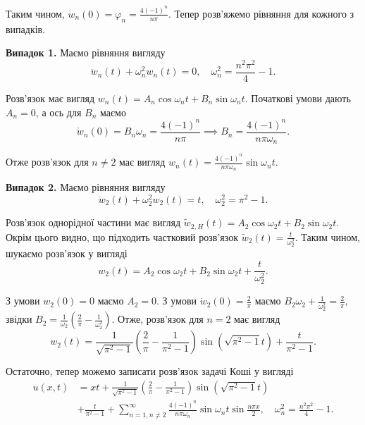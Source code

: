 \documentclass{exam_template}
\begin{document}
Таким чином, $\dot{w}_n(0) = \varphi_n = \frac{4(-1)^n}{n\pi}$. Тепер 
розв'яжемо рівняння для кожного з випадків.

\textbf{Випадок 1.} Маємо рівняння вигляду
\begin{equation*}
    \ddot{w}_n(t) + \omega_n^2 w_n(t) = 0, \quad \omega_n^2 = \frac{n^2\pi^2}{4}-1.
\end{equation*}

Розв'язок має вигляд $w_n(t) = A_n \cos \omega_n t + B_n \sin \omega_n t$.
Початкові умови дають $A_n=0$, а ось для $B_n$ маємо
\begin{equation*}
    \dot{w}_n(0) = B_n \omega_n = \frac{4(-1)^n}{n\pi} \implies B_n = \frac{4(-1)^n}{n\pi \omega_n}.
\end{equation*}

Отже розв'язок для $n \neq 2$ має вигляд $w_n(t) = \frac{4(-1)^n}{n\pi \omega_n} \sin \omega_n t$.

\textbf{Випадок 2.} Маємо рівняння вигляду
\begin{equation*}
    \ddot{w}_2(t) + \omega_2^2 w_2(t) = t, \quad \omega_2^2 = \pi^2 - 1.
\end{equation*}

Розв'язок однорідної частини має вигляд $\widetilde{w}_{2,H}(t) = A_2 \cos
\omega_2 t + B_2 \sin \omega_2 t$. Окрім цього видно, що 
підходить частковий розв'язок $\widetilde{w}_2(t) = \frac{t}{\omega_2^2}$.
Таким чином, шукаємо розв'язок у вигляді
\begin{equation*}
    w_2(t) = A_2 \cos \omega_2 t + B_2 \sin \omega_2 t + \frac{t}{\omega_2^2}.
\end{equation*}

З умови $w_2(0)=0$ маємо $A_2=0$. З умови $\dot{w}_2(0) = \frac{2}{\pi}$ маємо
$B_2\omega_2 + \frac{1}{\omega_2^2} = \frac{2}{\pi}$, звідки $B_2 =
\frac{1}{\omega_2}\left(\frac{2}{\pi} - \frac{1}{\omega_2^2}\right)$.
Отже, розв'язок для $n=2$ має вигляд
\begin{equation*}
    w_2(t) = \frac{1}{\sqrt{\pi^2-1}}\left(\frac{2}{\pi} - \frac{1}{\pi^2-1}\right) \sin(\sqrt{\pi^2-1} t) + \frac{t}{\pi^2-1}.
\end{equation*}

Остаточно, тепер можемо записати розв'язок задачі Коші у вигляді
\begin{align*}
    u(x,t) &= xt + \frac{1}{\sqrt{\pi^2-1}}\left(\frac{2}{\pi} - \frac{1}{\pi^2-1}\right) \sin(\sqrt{\pi^2-1} t) \\
    &+ \frac{t}{\pi^2-1} + \sum_{n=1,n \neq 2}^{\infty} \frac{4(-1)^n}{n\pi \omega_n} \sin \omega_n t \sin \frac{n \pi x}{2}, \quad \omega_n^2 = \frac{n^2\pi^2}{4}-1.
\end{align*}
\end{document}
